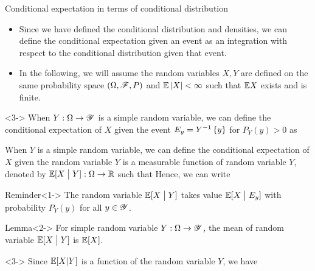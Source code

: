\documentclass[12pt,aspectratio=169]{beamer}
\begin{document}
\begin{frame}{Conditional expectation in terms of conditional distribution}
\begin{itemize}
\item <1-> Since we have defined the conditional distribution and densities, we can define the conditional expectation given an event as an integration with respect to the conditional distribution given that event.  
\item <2-> In the following, we will assume the random variables $X,Y$ are defined on the same probability space $(\Omega, \mathscr{F}, P)$ and $\mathbb{E}\left\lvert X\right\rvert < \infty$ such that $\mathbb{E} X$ exists and is finite.
\end{itemize}

\begin{Definition}<3->
When $Y:\Omega\to\mathscr{Y}$ is a simple random variable, 
we can define the conditional expectation of $X$ given the event $E_y = Y^{-1}\left\{y\right\}$ for $P_Y(y) > 0$ as 
\end{Definition}
\end{frame}

\begin{frame}
\begin{Definition} 
When $Y$ is a simple random variable, we can define the conditional expectation of $X$ given the random variable $Y$ is a measurable function of random variable $Y$, denoted by $\mathbb{E}[X\; \big\vert \; Y]: \Omega \to \mathbb{R}$ such that 
Hence, we can write
\end{Definition}
\end{frame}

\begin{frame}
\begin{block}{Reminder}<1->
The random variable $\mathbb{E}[X\; \big\vert \; Y]$ takes value $\mathbb{E}[X\; \big\vert \; E_y]$ with probability $P_Y(y)$ for all $y \in \mathscr{Y}$. 
\end{block}
\begin{block}{Lemma}<2->
For simple random variable $Y: \Omega \to \mathscr{Y}$, 
the mean of random variable $\mathbb{E}[X \; \big\vert \; Y]$ is $\mathbb{E}[X]$. 
\end{block}

\begin{Proof}<3->
Since $\mathbb{E}[X|Y]$ is a function of the random variable $Y$, we have 
\end{Proof}
\end{frame}
\end{document}
